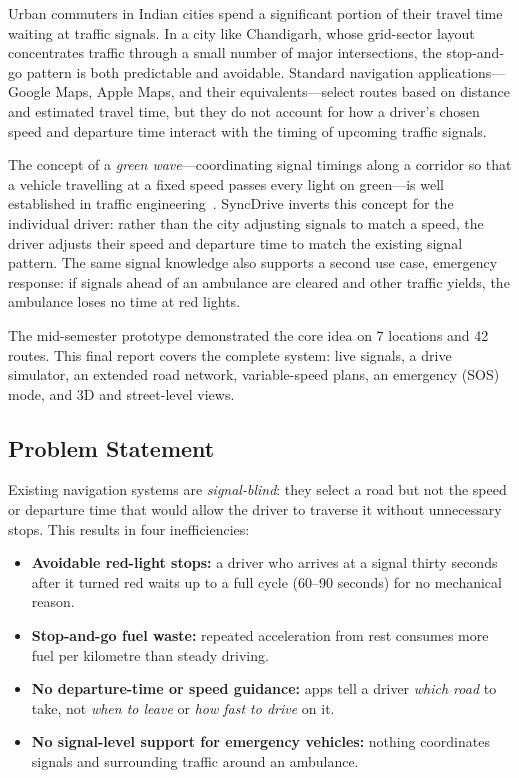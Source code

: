 \documentclass[12pt,a4paper]{report}
\begin{document}
Urban commuters in Indian cities spend a significant portion of their travel
time waiting at traffic signals. In a city like Chandigarh, whose grid-sector
layout concentrates traffic through a small number of major intersections, the
stop-and-go pattern is both predictable and avoidable. Standard navigation
applications---Google Maps, Apple Maps, and their equivalents---select routes
based on distance and estimated travel time, but they do not account for how a
driver's chosen speed and departure time interact with the timing of upcoming
traffic signals.

The concept of a \textit{green wave}---coordinating signal timings along a
corridor so that a vehicle travelling at a fixed speed passes every light on
green---is well established in traffic engineering~\cite{GreenWave10}.
SyncDrive inverts this concept for the individual driver: rather than the city
adjusting signals to match a speed, the driver adjusts their speed and
departure time to match the existing signal pattern. The same signal knowledge
also supports a second use case, emergency response: if signals ahead of an
ambulance are cleared and other traffic yields, the ambulance loses no time at
red lights.

The mid-semester prototype demonstrated the core idea on 7 locations and 42
routes. This final report covers the complete system: live signals, a drive
simulator, an extended road network, variable-speed plans, an emergency (SOS)
mode, and 3D and street-level views.

\subsection{Problem Statement}

Existing navigation systems are \textit{signal-blind}: they select a road but
not the speed or departure time that would allow the driver to traverse it
without unnecessary stops. This results in four inefficiencies:

\begin{itemize}
  \item \textbf{Avoidable red-light stops:} a driver who arrives at a signal
        thirty seconds after it turned red waits up to a full cycle (60--90
        seconds) for no mechanical reason.
  \item \textbf{Stop-and-go fuel waste:} repeated acceleration from rest
        consumes more fuel per kilometre than steady driving.
  \item \textbf{No departure-time or speed guidance:} apps tell a driver
        \textit{which road} to take, not \textit{when to leave} or
        \textit{how fast to drive} on it.
  \item \textbf{No signal-level support for emergency vehicles:} nothing
        coordinates signals and surrounding traffic around an ambulance.
\end{itemize}
\end{document}
